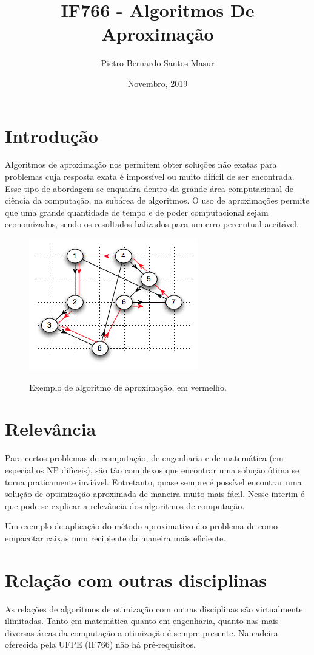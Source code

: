 \documentclass{article}
\title{IF766 - Algoritmos De Aproximação}
\author{Pietro Bernardo Santos Masur}
\date{Novembro, 2019}
\begin{document}
\maketitle

\section{Introdução}
Algoritmos de aproximação nos permitem obter soluções não exatas para problemas cuja resposta exata é impossível ou muito difícil de ser encontrada. Esse tipo de abordagem se enquadra dentro da grande área computacional de ciência da computação, na subárea de algoritmos. O uso de aproximações permite que uma grande quantidade de tempo e de poder computacional sejam economizados, sendo os resultados balizados para um erro percentual aceitável.
\begin{figure}[h!]
\centering
\includegraphics[scale=0.8]{pbsm.png}
\caption{Exemplo de algoritmo de aproximação, em vermelho.}\cite{Algoritmo}
\label{fig:Exemplo algoritmo}
\end{figure}

\section{Relevância}
\par
Para certos problemas de computação, de engenharia e de matemática (em especial os NP difíceis), são tão complexos que encontrar uma solução ótima se torna praticamente inviável. Entretanto, quase sempre é possível encontrar uma solução de optimização aproximada de maneira muito mais fácil. Nesse interim é que pode-se explicar a relevância dos algoritmos de computação.
\par
Um exemplo de aplicação do método aproximativo é o problema de como empacotar caixas num recipiente da maneira mais eficiente.\citep{VANSTEE2004535}
\section{Relação com outras disciplinas}
\par
As relações de algoritmos de otimização com outras disciplinas são virtualmente ilimitadas. Tanto em matemática quanto em engenharia, quanto nas mais diversas áreas da computação a otimização é sempre presente.\citep{wikipedia} Na cadeira oferecida pela UFPE (IF766) não há pré-requisitos.



\end{document}

